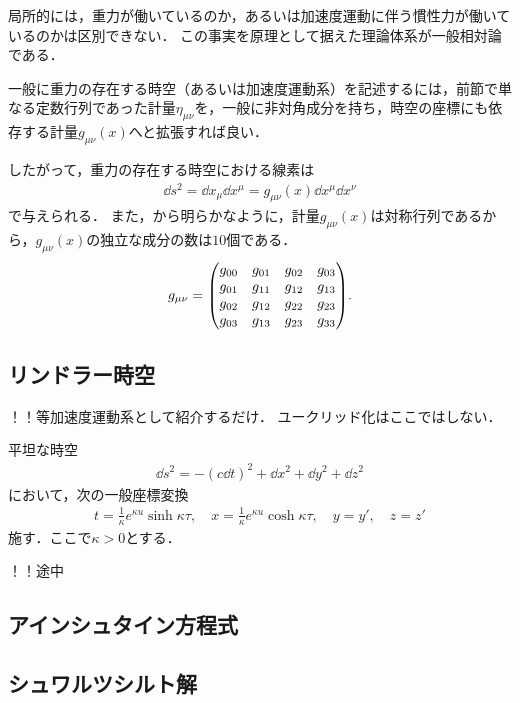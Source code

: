 \documentclass[uplatex,dvipdfmx]{vkaishi}
\begin{document}

局所的には，重力が働いているのか，あるいは加速度運動に伴う慣性力が働いているのかは区別できない．
この事実を原理として据えた理論体系が一般相対論である．

一般に重力の存在する時空（あるいは加速度運動系）を記述するには，前節で単なる定数行列であった計量$\eta_{\mu\nu}$を，一般に非対角成分を持ち，時空の座標にも依存する計量$g_{\mu\nu}(x)$へと拡張すれば良い．

したがって，重力の存在する時空における線素は
\begin{align}
  \dd{s}^2
  = \dd{x}_\mu \dd{x}^\mu
  = g_{\mu\nu}(x) \dd{x}^\mu \dd{x}^\nu
  \label{eq:metric-g}
\end{align}
で与えられる．
また，から明らかなように，計量$g_{\mu\nu}(x)$は対称行列であるから，$g_{\mu\nu}(x)$の独立な成分の数は$10$個である．
\begin{align}
  g_{\mu\nu}
  = \mqty(g_{00} & g_{01} & g_{02} & g_{03} \\
          g_{01} & g_{11} & g_{12} & g_{13} \\
          g_{02} & g_{12} & g_{22} & g_{23} \\
          g_{03} & g_{13} & g_{23} & g_{33} ).
\end{align}


\subsection{リンドラー時空}
！！等加速度運動系として紹介するだけ．
ユークリッド化はここではしない．

平坦な時空
\begin{align}
  \dd{s}^2 = - (c\dd{t})^2 + \dd{x}^2 + \dd{y}^2 + \dd{z}^2
\end{align}
において，次の一般座標変換
\begin{align}
  t = \frac{1}{\kappa} e^{\kappa u} \sinh{\kappa \tau},\quad
  x = \frac{1}{\kappa} e^{\kappa u} \cosh{\kappa \tau},\quad
  y = y',\quad
  z = z'
\end{align}
施す．ここで$\kappa > 0$とする．

！！途中

\subsection{アインシュタイン方程式}


\subsection{シュワルツシルト解}
\end{document}
